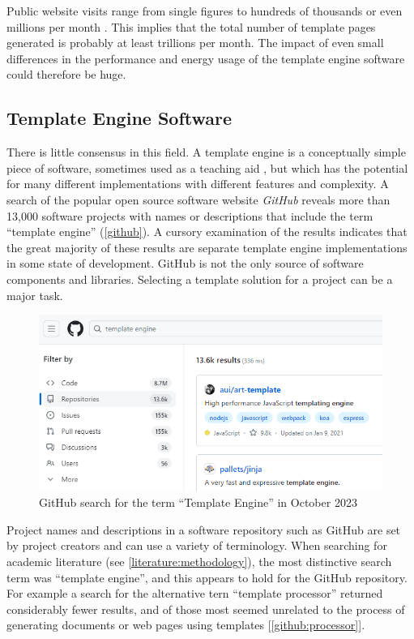 Public website visits range from single figures to hundreds of thousands or even millions per month \citep{Castillo2023}. This implies that the total number of template pages generated is probably at least trillions per month. The impact of even small differences in the performance and energy usage of the \gls{template engine} software could therefore be huge.

\subsection{Template Engine Software}
\label{subsection:engines}

There is little consensus in this field. A \gls{template engine} is a conceptually simple piece of software, sometimes used as a teaching aid \citep{Koskela2007}, but which has the potential for many different implementations with different features and complexity. A search of the popular open source software website \emph{GitHub} \citep{GitHubGeneral} reveals more than 13,000 software projects with names or descriptions that include the term \enquote{template engine} (\autoref{github}). A cursory examination of the results indicates that the great majority of these results are separate \gls{template engine} implementations in some state of development. GitHub is not the only source of software components and libraries. Selecting a template solution for a project can be a major task.

\begin{figure}[ht!]
\centering
\includegraphics[width=\columnwidth]{Figures/template-engines-2023.png}
\caption{GitHub search for the term \enquote{Template Engine} in October 2023}
\label{github}
\end{figure}

Project names and descriptions in a software repository such as GitHub are set by project creators and can use a variety of terminology. When searching for academic literature (see \autoref{literature:methodology}), the most distinctive search term was \enquote{template engine}, and this appears to hold for the GitHub repository. For example a search for the alternative tern \enquote{template processor} returned considerably fewer results, and of those most seemed unrelated to the process of generating documents or web pages using templates [\autoref{github:processor}].

